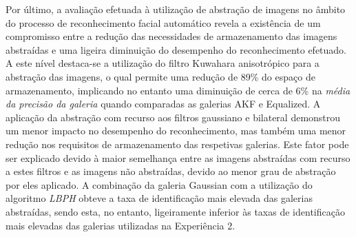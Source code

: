 \documentclass{llncs}
\begin{document}
Por último, a avaliação efetuada à utilização de abstração de imagens no âmbito do processo de reconhecimento facial automático revela a existência de um compromisso entre a redução das necessidades de armazenamento das imagens abstraídas e uma ligeira diminuição do desempenho do reconhecimento efetuado. A este nível destaca-se a utilização do filtro Kuwahara anisotrópico para a abstração das imagens, o qual permite uma redução de 89\% do espaço de armazenamento, implicando no entanto uma diminuição de cerca de 6\% na \textit{média da precisão da galeria} quando comparadas as galerias AKF e Equalized. A aplicação da abstração com recurso aos filtros gaussiano e bilateral demonstrou um menor impacto no desempenho do reconhecimento, mas também uma menor redução nos requisitos de armazenamento das respetivas galerias. Este fator pode ser explicado devido à maior semelhança entre as imagens abstraídas com recurso a estes filtros e as imagens não abstraídas, devido ao menor grau de abstração por eles aplicado. A combinação da galeria Gaussian com a utilização do algoritmo \textit{LBPH} obteve a taxa de identificação mais elevada das galerias abstraídas, sendo esta, no entanto, ligeiramente inferior às taxas de identificação mais elevadas das galerias utilizadas na Experiência 2. 



\end{document}
